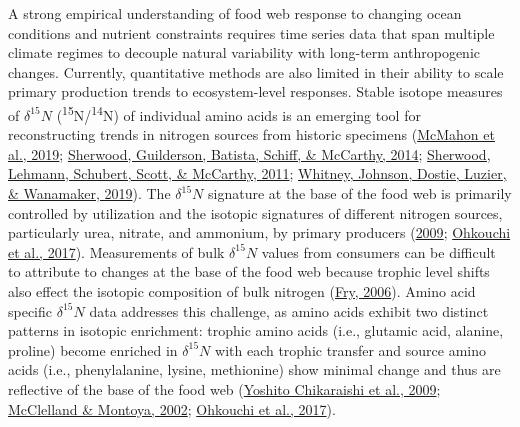 \documentclass [11pt, proquest] {uwthesis}[2015/03/03]
\begin{document}
A strong empirical understanding of food web response to changing ocean conditions and nutrient constraints requires time series data that span multiple climate regimes to decouple natural variability with long-term anthropogenic changes. Currently, quantitative methods are also limited in their ability to scale primary production trends to ecosystem-level responses. Stable isotope measures of \(\delta^{15}N\) (\textsuperscript{15}N/\textsuperscript{14}N) of individual amino acids is an emerging tool for reconstructing trends in nitrogen sources from historic specimens (\protect\hyperlink{ref-McMahon2019}{McMahon et al., 2019}; \protect\hyperlink{ref-Sherwood2014}{Sherwood, Guilderson, Batista, Schiff, \& McCarthy, 2014}; \protect\hyperlink{ref-Sherwood2011}{Sherwood, Lehmann, Schubert, Scott, \& McCarthy, 2011}; \protect\hyperlink{ref-Whitney2019}{Whitney, Johnson, Dostie, Luzier, \& Wanamaker, 2019}). The \(\delta^{15}N\) signature at the base of the food web is primarily controlled by utilization and the isotopic signatures of different nitrogen sources, particularly urea, nitrate, and ammonium, by primary producers (\protect\hyperlink{ref-Graham2010}{2009}; \protect\hyperlink{ref-Ohkouchi2017}{Ohkouchi et al., 2017}). Measurements of bulk \(\delta^{15}N\) values from consumers can be difficult to attribute to changes at the base of the food web because trophic level shifts also effect the isotopic composition of bulk nitrogen (\protect\hyperlink{ref-Fry2006}{Fry, 2006}). Amino acid specific \(\delta^{15}N\) data addresses this challenge, as amino acids exhibit two distinct patterns in isotopic enrichment: trophic amino acids (i.e., glutamic acid, alanine, proline) become enriched in \(\delta^{15}N\) with each trophic transfer and source amino acids (i.e., phenylalanine, lysine, methionine) show minimal change and thus are reflective of the base of the food web (\protect\hyperlink{ref-Chikaraishi2009}{Yoshito Chikaraishi et al., 2009}; \protect\hyperlink{ref-McClelland2002}{McClelland \& Montoya, 2002}; \protect\hyperlink{ref-Ohkouchi2017}{Ohkouchi et al., 2017}).
\end{document}
